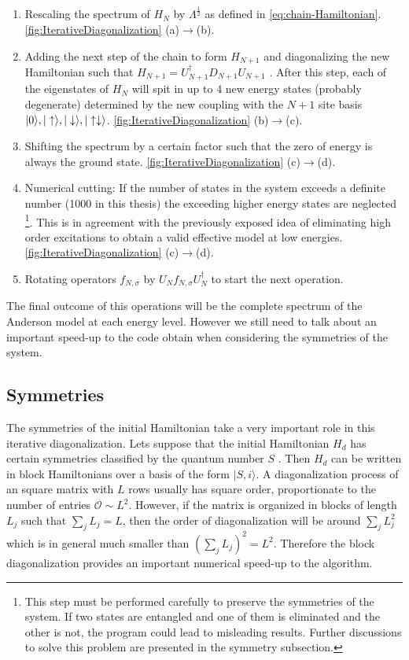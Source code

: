 \begin{enumerate}
 	\item Rescaling the spectrum of $H_{N}$ by $\Lambda^{\frac{1}{2}}$ as defined in \eqref{eq:chain-Hamiltonian}. \ref{fig:IterativeDiagonalization} (a)$\rightarrow$(b).
 	\item Adding the next step of the chain to form $H_{N+1}$ and diagonalizing the new Hamiltonian such that $H_{N+1} = U_{N+1}^\dagger D_{N+1} U_{N+1}$ . After this step, each of the eigenstates of $H_{N}$ will spit in up to $4$ new energy states (probably degenerate) determined by the new coupling with the  $N+1$ site basis ${\vert 0 \rangle, \vert \uparrow \rangle, \vert \downarrow \rangle, \vert \uparrow \downarrow \rangle}$.  \ref{fig:IterativeDiagonalization} (b)$\rightarrow$(c).
 	\item Shifting the spectrum by a certain factor such that the zero of energy is always the ground state.  \ref{fig:IterativeDiagonalization} (c)$\rightarrow$(d).
 	\item Numerical cutting: If the number of states in the system exceeds a definite number (1000 in this thesis) the exceeding higher energy states are neglected \footnote{ This step must be performed carefully to preserve the symmetries of the system. If two states are entangled and one of them is eliminated and the other is not, the program could lead to misleading results. Further discussions to solve this problem are presented in the symmetry subsection.  }. This is in agreement with the previously exposed  idea of eliminating high order excitations to obtain a valid effective model at low energies. \ref{fig:IterativeDiagonalization} (c)$\rightarrow$(d).
 	\item Rotating operators $f_{N,\sigma}$  by $ U_N f_{N,\sigma} U_N^\dagger$ to start the next operation.
\end{enumerate}

The final outcome of this operations will be the complete spectrum of the Anderson model at each energy level. However we still need to talk about an important speed-up to the code obtain when considering the symmetries of the system. 

\subsection{Symmetries \label{subsec:Syms}}

The symmetries of the initial Hamiltonian take a very important role in this iterative diagonalization. Lets suppose that the initial Hamiltonian $H_d$ has certain symmetries classified by the quantum number $S$ . Then $H_d$ can be written  in block Hamiltonians over a basis of the form $\vert S, i\rangle$. A diagonalization process of an square matrix with $L$ rows usually has square order, proportionate to the number of entries $\mathcal{O}\sim L^2$. However, if the matrix is organized in blocks of length $L_j$  such that $\sum_j L_j = L$, then the order of diagonalization will be around $\sum_j L_j^2  $ which is in general much smaller than $(\sum_j L_j)^2 = L^2$. Therefore the block diagonalization provides an important numerical speed-up to the algorithm. 

